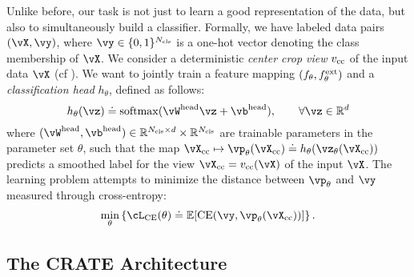 \documentclass[../../book-main.tex]{subfiles}
\begin{document}
Unlike before, our task is not just to learn a good representation of the data, but also to simultaneously build a classifier. Formally, we have labeled data pairs \((\vX, \vy)\), where \(\vy \in \{0, 1\}^{N_{\cls}}\) is a one-hot vector denoting the class membership of \(\vX\). We consider a deterministic \textit{center crop view} \(v_{\mathrm{cc}}\) of the input data \(\vX\) (cf ). We want to jointly train a feature mapping \((f_{\theta}, f_{\theta}^{\mathrm{ext}})\) and a \textit{classification head} \(h_{\theta}\), defined as follows:
\begin{equation}
    h_{\theta}(\vz) \doteq \softmax(\vW^{\head}\vz + \vb^{\head}), \qquad  \forall \vz \in \R^{d}
\end{equation}
where \((\vW^{\head}, \vb^{\head}) \in \R^{N_{\cls} \times d} \times \R^{N_{\cls}}\) are trainable parameters in the parameter set \(\theta\), such that the map \(\vX_{\cc} \mapsto \vp_{\theta}(\vX_{\cc}) \doteq h_{\theta}(\vz_{\theta}(\vX_{\cc}))\) predicts a smoothed label for the view \(\vX_{\cc} = v_{\cc}(\vX)\) of the input \(\vX\). The learning problem attempts to minimize the distance between \(\vp_{\theta}\) and \(\vy\) measured through cross-entropy:
\begin{equation}\label{eq:classification_ce_loss}
    \min_{\theta}\bc{\cL_{\CE}(\theta) \doteq \Ex[\CE(\vy, \vp_{\theta}(\vX_{\cc}))]}.
\end{equation}


\subsection{The CRATE Architecture}\label{sub:image_classification_architecture}
\end{document}

